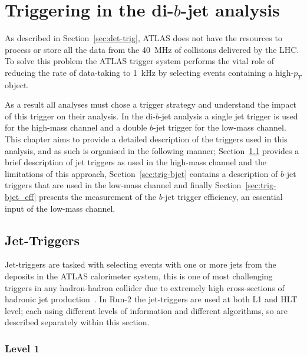 \chapter{Triggering in the di-$b$-jet analysis}
\label{sec:trig}

As described in Section~\ref{sec:det-trig},
ATLAS does not have the resources to process or store all the data from the 40~MHz of collisions delivered by the LHC.
To solve this problem the ATLAS trigger system performs the vital role of
reducing the rate of data-taking to 1~kHz by selecting events containing a high-$p_T$ object. 

As a result all analyses must chose a trigger strategy and understand the impact of this trigger on their analysis.
In the di-$b$-jet analysis a single jet trigger is used for the high-mass channel
and a double $b$-jet trigger for the low-mass channel.
This chapter aims to provide a detailed description of the triggers used in this analysis,
and as such is organised in the following manner;
Section~\ref{sec:trig-jet} provides a brief description of jet triggers as used in the high-mass channel and the limitations of this approach,
Section~\ref{sec:trig-bjet} contains a description of $b$-jet triggers that are used in the low-mass channel
and finally Section~\ref{sec:trig-bjet_eff} presents the measurement of the $b$-jet trigger efficiency, an essential input of the low-mass channel.

\section{Jet-Triggers}
\label{sec:trig-jet}

Jet-triggers are tasked with selecting events with one or more jets from the deposits in the ATLAS calorimeter system,
this is one of most challenging triggers in any hadron-hadron collider due to extremely high cross-sections of hadronic jet production~\cite{trig-run2_proc}.
In Run-2 the jet-triggers are used at both L1 and HLT level; each using different levels of information and different algorithms,
so are described separately within this section.

\subsection{Level 1}

